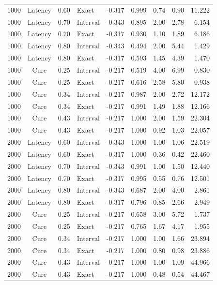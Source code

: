 \documentclass[12pt]{article}
\theoremstyle{definition}
\theoremstyle{remark}
\begin{document}
\begin{longtable}{rcrlrrrrr}
1000 & Latency & 0.60 & Exact & -0.317 & 0.999 & 0.74 & 0.90 & 11.222 \\
1000 & Latency & 0.70 & Interval & -0.343 & 0.895 & 2.00 & 2.78 & 6.154 \\
1000 & Latency & 0.70 & Exact & -0.317 & 0.930 & 1.10 & 1.89 & 6.186 \\
1000 & Latency & 0.80 & Interval & -0.343 & 0.494 & 2.00 & 5.44 & 1.429 \\
1000 & Latency & 0.80 & Exact & -0.317 & 0.593 & 1.45 & 4.39 & 1.470 \\
1000 & Cure & 0.25 & Interval & -0.217 & 0.519 & 4.00 & 6.99 & 0.830 \\
1000 & Cure & 0.25 & Exact & -0.217 & 0.616 & 2.58 & 5.80 & 0.938 \\
1000 & Cure & 0.34 & Interval & -0.217 & 0.987 & 2.00 & 2.72 & 12.172 \\
1000 & Cure & 0.34 & Exact & -0.217 & 0.991 & 1.49 & 1.88 & 12.166 \\
1000 & Cure & 0.43 & Interval & -0.217 & 1.000 & 2.00 & 1.59 & 22.304 \\
1000 & Cure & 0.43 & Exact & -0.217 & 1.000 & 0.92 & 1.03 & 22.057 \\
2000 & Latency & 0.60 & Interval & -0.343 & 1.000 & 1.00 & 1.06 & 22.519 \\
2000 & Latency & 0.60 & Exact & -0.317 & 1.000 & 0.36 & 0.42 & 22.460 \\
2000 & Latency & 0.70 & Interval & -0.343 & 0.991 & 1.00 & 1.50 & 12.440 \\
2000 & Latency & 0.70 & Exact & -0.317 & 0.995 & 0.55 & 0.76 & 12.501 \\
2000 & Latency & 0.80 & Interval & -0.343 & 0.687 & 2.00 & 4.00 & 2.861 \\
2000 & Latency & 0.80 & Exact & -0.317 & 0.796 & 0.85 & 2.66 & 2.949 \\
2000 & Cure & 0.25 & Interval & -0.217 & 0.658 & 3.00 & 5.72 & 1.737 \\
2000 & Cure & 0.25 & Exact & -0.217 & 0.765 & 1.67 & 4.17 & 1.955 \\
2000 & Cure & 0.34 & Interval & -0.217 & 1.000 & 1.00 & 1.66 & 23.894 \\
2000 & Cure & 0.34 & Exact & -0.217 & 1.000 & 0.80 & 0.98 & 23.886 \\
2000 & Cure & 0.43 & Interval & -0.217 & 1.000 & 1.00 & 1.09 & 44.966 \\
2000 & Cure & 0.43 & Exact & -0.217 & 1.000 & 0.48 & 0.54 & 44.467 \\
\end{longtable}
\endgroup
\end{document}
